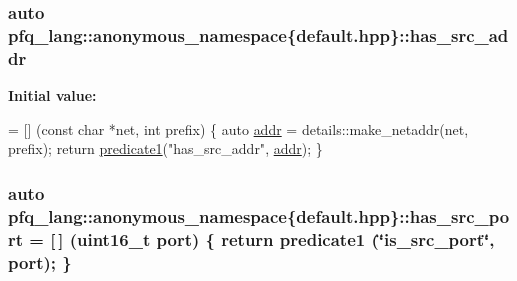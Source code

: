 \hypertarget{namespacepfq__lang_1_1anonymous__namespace_02default_8hpp_03_aabc75799de679df702f4179ead82114c}{
\subsubsection[{has\+\_\+src\+\_\+addr}]{\setlength{\rightskip}{0pt plus 5cm}auto pfq\+\_\+lang\+::anonymous\+\_\+namespace\{default.\+hpp\}\+::has\+\_\+src\+\_\+addr}}\label{namespacepfq__lang_1_1anonymous__namespace_02default_8hpp_03_aabc75799de679df702f4179ead82114c}
{\bfseries Initial value\+:}
\begin{DoxyCode}
= [] (\textcolor{keyword}{const} \textcolor{keywordtype}{char} *net, \textcolor{keywordtype}{int} prefix)
        \{
            \textcolor{keyword}{auto} \hyperlink{namespacepfq__lang_1_1anonymous__namespace_02default_8hpp_03_aafce8334d1be83bff9a2115439c8c453}{addr} = details::make\_netaddr(net, prefix);
            \textcolor{keywordflow}{return} \hyperlink{namespacepfq__lang_ad4fceab90861beacc0490bd58a72bb05}{predicate1}(\textcolor{stringliteral}{"has\_src\_addr"}, \hyperlink{namespacepfq__lang_1_1anonymous__namespace_02default_8hpp_03_aafce8334d1be83bff9a2115439c8c453}{addr});
        \}
\end{DoxyCode}
\hypertarget{namespacepfq__lang_1_1anonymous__namespace_02default_8hpp_03_ad6d8ed8e08a448b3bf5d23a929d887f9}{
\subsubsection[{has\+\_\+src\+\_\+port}]{\setlength{\rightskip}{0pt plus 5cm}auto pfq\+\_\+lang\+::anonymous\+\_\+namespace\{default.\+hpp\}\+::has\+\_\+src\+\_\+port = \mbox{[}$\,$\mbox{]} (uint16\+\_\+t {\bf port}) \{ return {\bf predicate1} (\char`\"{}is\+\_\+src\+\_\+port\char`\"{}, port); \}}}\label{namespacepfq__lang_1_1anonymous__namespace_02default_8hpp_03_ad6d8ed8e08a448b3bf5d23a929d887f9}
